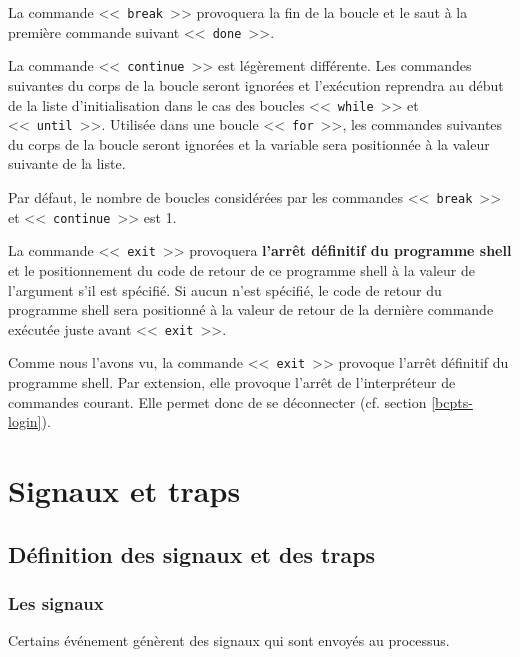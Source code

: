 La commande <<~\texttt{break}~>> provoquera la fin de la boucle et le saut {\`a} la premi{\`e}re
commande suivant <<~\texttt{done}~>>.

La commande <<~\texttt{continue}~>> est l{\'e}g{\`e}rement diff{\'e}rente. Les
commandes suivantes du corps de la boucle seront ignor{\'e}es et l'ex{\'e}cution
reprendra au d{\'e}but de la liste d'initialisation dans le cas des boucles
<<~\texttt{while}~>> et <<~\texttt{until}~>>. Utilis{\'e}e dans une boucle <<~\texttt{for}~>>,
les commandes suivantes du corps de la boucle seront ignor{\'e}es et la
variable sera positionn{\'e}e {\`a} la valeur suivante de la liste.

Par d{\'e}faut, le nombre de boucles consid{\'e}r{\'e}es par les commandes <<~\texttt{break}~>>
et <<~\texttt{continue}~>> est 1.

La commande <<~\texttt{exit}~>> provoquera \textbf{l'arr{\^e}t d{\'e}finitif du
programme shell} et le positionnement du code de retour de ce programme
shell {\`a} la valeur de l'argument s'il est sp{\'e}cifi{\'e}. Si aucun n'est
sp{\'e}cifi{\'e}, le code de retour du programme shell sera positionn{\'e} {\`a} la
valeur de retour de la derni{\`e}re commande ex{\'e}cut{\'e}e juste avant <<~\texttt{exit}~>>.

\begin{remarque}
Comme nous l'avons vu, la commande <<~\texttt{exit}~>> provoque l'arr{\^e}t d{\'e}finitif du
programme shell. Par extension, elle provoque l'arr{\^e}t de l'interpr{\'e}teur de commandes
courant. Elle permet donc de se d{\'e}connecter (cf. section \ref{bcpts-login}).
\end{remarque}

\section{Signaux et traps}

\subsection{D{\'e}finition des signaux et des traps}

\subsubsection{Les signaux}

Certains {\'e}v{\'e}nement g{\'e}n{\`e}rent des signaux
qui sont envoy{\'e}s au processus.

